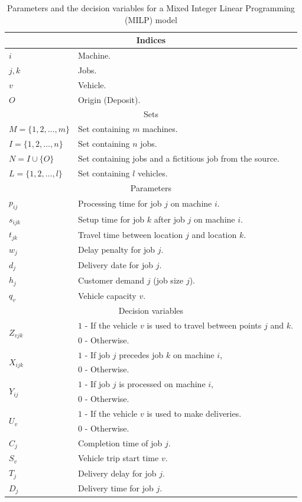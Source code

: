 \documentclass{article}
\begin{document}
\begin{table}
\centering %
\caption{ Parameters and the decision variables for a Mixed Integer Linear Programming (MILP) model \label{tab:modelo}}
{
\begin{tabular}{|ll|}
\hline
\multicolumn{2}{|c|}{Indices} \\ \hline
$i$ & Machine. \\
$j,k$ & Jobs. \\
$v$ & Vehicle. \\
$O$ & Origin (Deposit). \\ \hline
\multicolumn{2}{|c|}{Sets} \\ \hline
${M=\{1,2,…,m\}}$ & Set containing $m$ machines. \\
${I=\{1,2,…,n\}}$ & Set containing $n$ jobs. \\
${N=I \cup \{O\}}$ & Set containing jobs and a fictitious job from the source. \\
${L=\{1,2,…,l\}}$ & Set containing $l$ vehicles. \\ \hline
\multicolumn{2}{|c|}{Parameters} \\ \hline
$p_{ij}$ & Processing time for job $j$ on machine $i$. \\
$s_{ijk}$ & Setup time for job $k$ after job $j$ on machine $i$. \\
$t_{jk}$ & Travel time between location $j$ and location $k$. \\
$w_j$ & Delay penalty for job $j$. \\
$d_j$ & Delivery date for job $j$. \\
$h_j$ & Customer demand $j$ (job size $j$). \\
$q_v$ & Vehicle capacity $v$. \\ \hline
\multicolumn{2}{|c|}{Decision variables} \\ \hline
\multirow{2}{*}{$Z_{vjk}$} & $1$ - If the vehicle $v$ is used to travel between points $j$ and $k$. \\
                           & $0$ - Otherwise. \\
\multirow{2}{*}{$X_{ijk}$} & $1$ - If job $j$ precedes job $k$ on machine $i$, \\
                           & $0$ - Otherwise. \\
\multirow{2}{*}{$Y_{ij}$}  & $1$ - If job $j$ is processed on machine $i$, \\
                           & $0$ - Otherwise. \\
\multirow{2}{*}{$U_v$}     & $1$ - If the vehicle $v$ is used to make deliveries. \\
                           & $0$ - Otherwise. \\
$C_j$ & Completion time of job $j$. \\
$S_v$ & Vehicle trip start time $v$. \\
$T_j$ & Delivery delay for job $j$. \\
$D_j$ & Delivery time for job $j$. \\ \hline                                           
\end{tabular}%
}{}
\end{table}
\end{document}
